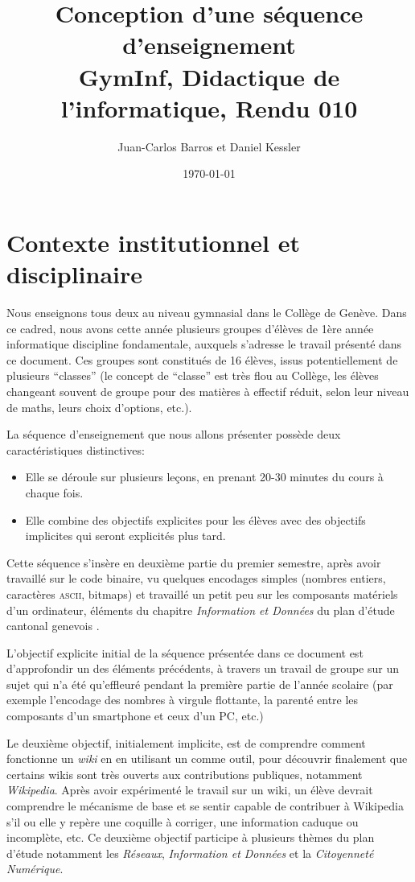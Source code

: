 \documentclass[11pt,bibliography=totoc]{scrartcl}
\author{Juan-Carlos Barros et Daniel Kessler}
\date{\today}
\title{Conception d'une séquence d'enseignement\\\medskip
  \large GymInf, Didactique de l'informatique, Rendu 010}
\begin{document}
\maketitle
\tableofcontents

\pagebreak

\section{Contexte institutionnel et disciplinaire}
Nous enseignons tous deux au niveau gymnasial dans le Collège de Genève. Dans ce
cadred, nous avons cette année plusieurs groupes d'élèves de 1ère année
informatique discipline fondamentale, auxquels s'adresse le travail présenté
dans ce document. Ces groupes sont constitués de 16 élèves, issus
potentiellement de plusieurs ``classes'' (le concept de ``classe'' est très flou
au Collège, les élèves changeant souvent de groupe pour des matières à effectif
réduit, selon leur niveau de maths, leurs choix d'options, etc.).

La séquence d'enseignement que nous allons présenter possède deux
caractéristiques distinctives:
\begin{itemize}
\item Elle se déroule sur plusieurs leçons, en prenant 20-30 minutes du cours à
  chaque fois.
\item Elle combine des objectifs explicites pour les élèves avec des objectifs
  implicites qui seront explicités plus tard.
\end{itemize}

Cette séquence s'insère en deuxième partie du premier semestre, après avoir
travaillé sur le code binaire, vu quelques encodages simples (nombres entiers,
caractères \textsc{ascii}, bitmaps) et travaillé un petit peu sur les composants
matériels d'un ordinateur, éléments du chapitre \textit{Information et Données}
du plan d'étude cantonal genevois \cite{pecinfo}.

L'objectif explicite initial de la séquence présentée dans ce document est
d'approfondir un des éléments précédents, à travers un travail de groupe sur un
sujet qui n'a été qu'effleuré pendant la première partie de l'année scolaire
(par exemple l'encodage des nombres à virgule flottante, la parenté entre les
composants d'un smartphone et ceux d'un PC, etc.)

Le deuxième objectif, initialement implicite, est de comprendre comment
fonctionne un \textit{wiki} en en utilisant un comme outil, pour découvrir
finalement que certains wikis sont très ouverts aux contributions publiques,
notamment \textit{Wikipedia}. Après avoir expérimenté le travail sur un wiki, un
élève devrait comprendre le mécanisme de base et se sentir capable de contribuer
à Wikipedia s'il ou elle y repère une coquille à corriger, une information
caduque ou incomplète, etc. Ce deuxième objectif participe à plusieurs thèmes du
plan d'étude notamment les \textit{Réseaux}, \textit{Information et Données} et
la \textit{Citoyenneté Numérique}.
\end{document}
